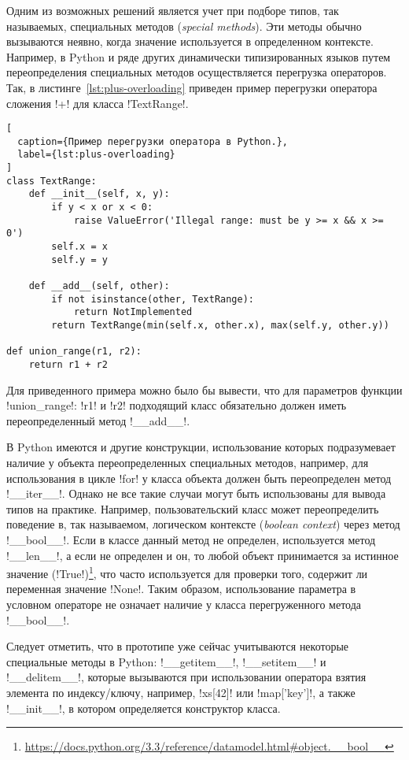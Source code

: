 Одним из возможных решений является учет при подборе типов, так называемых,
специальных методов (\emph{special methods}). Эти методы обычно вызываются
неявно, когда значение используется в определенном контексте. Например, в
Python и ряде других динамически типизированных языков путем переопределения
специальных методов осуществляется перегрузка операторов.  Так, в
листинге~\ref{lst:plus-overloading} приведен пример перегрузки оператора
сложения !+! для класса !TextRange!.

\begin{lstlisting}[
  caption={Пример перегрузки оператора в Python.},
  label={lst:plus-overloading}
]
сlass TextRange:
    def __init__(self, x, y):
        if y < x or x < 0:
            raise ValueError('Illegal range: must be y >= x && x >= 0')
        self.x = x
        self.y = y

    def __add__(self, other):
        if not isinstance(other, TextRange):
            return NotImplemented
        return TextRange(min(self.x, other.x), max(self.y, other.y))

def union_range(r1, r2):
    return r1 + r2    

\end{lstlisting}

Для приведенного примера можно было бы вывести, что для параметров функции
!union_range!: !r1! и !r2! подходящий класс обязательно должен иметь
переопределенный метод !__add__!. 

В Python имеются и другие конструкции, использование которых подразумевает
наличие у объекта переопределенных специальных методов, например, для
использования в цикле !for! у класса объекта должен быть переопределен метод
!__iter__!. Однако не все такие случаи могут быть использованы для вывода типов
на практике. Например, пользовательский класс может переопределить поведение в,
так называемом, логическом контексте (\emph{boolean context}) через метод
!__bool__!. Если в классе данный метод не определен, используется метод
!__len__!, а если не определен и он, то любой объект принимается за истинное
значение
(!True!)\footnote{\url{https://docs.python.org/3.3/reference/datamodel.html\#object.\_\_bool\_\_}},
что часто используется для проверки того, содержит ли переменная значение
!None!. Таким образом, использование параметра в условном операторе не означает
наличие у класса перегруженного метода !__bool__!.

Следует отметить, что в прототипе уже сейчас учитываются некоторые специальные
методы в Python: !__getitem__!, !__setitem__! и !__delitem__!,
которые вызываются при использовании оператора взятия элемента по индексу/ключу,
например, !xs[42]! или !map['key']!, а также !__init__!, в котором определяется
конструктор класса.

